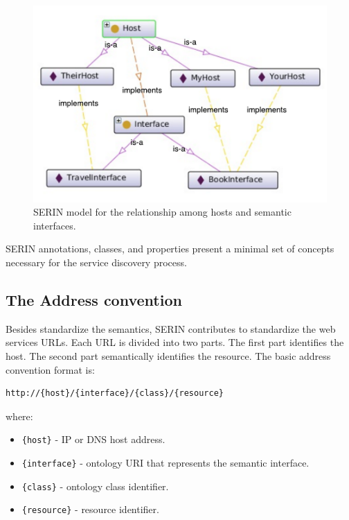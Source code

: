 \documentclass{singlecol-new}
\theoremstyle{TH}{
\newtheorem{lemma}{Lemma}
\newtheorem{theorem}[lemma]{Theorem}
\newtheorem{corrolary}[lemma]{Corrolary}
\newtheorem{conjecture}[lemma]{Conjecture}
\newtheorem{proposition}[lemma]{Proposition}
\newtheorem{claim}[lemma]{Claim}
\newtheorem{stheorem}[lemma]{Wrong Theorem}
\newtheorem{algorithm}{Algorithm}
}
\theoremstyle{THrm}{
\newtheorem{definition}{Definition}[section]
\newtheorem{question}{Question}[section]
\newtheorem{remark}{Remark}
\newtheorem{scheme}{Scheme}
}
\theoremstyle{THhit}{
\newtheorem{case}{Case}[section]
}
\begin{document}
\begin{figure}[!htb]
	\includegraphics[scale=.45]{images/host-interface-example.pdf}
	\centering
	\caption{SERIN model for the relationship among hosts and semantic interfaces.}
	\label{fig:host-interface-example}
\end{figure}

SERIN annotations, classes, and properties present a minimal set of concepts necessary for the service discovery process.

\subsection{The Address convention}
\label{sec:addressconvention}
Besides standardize the semantics, SERIN contributes to standardize the web services URLs. 
Each URL is divided into two parts. 
The first part identifies the host. 
The second part semantically identifies the resource. 
The basic address convention format is:

\begin{lstlisting}[frame=single, basicstyle=\small\ttfamily]
http://{host}/{interface}/{class}/{resource}
\end{lstlisting}

where:

\begin{itemize}
	\item \texttt{\{host\}} - IP or DNS host address.
	\item \texttt{\{interface\}} - ontology URI that represents the semantic interface.
	\item \texttt{\{class\}} - ontology class identifier.
	\item \texttt{\{resource\}} - resource identifier.
\end{itemize}
\end{document}
